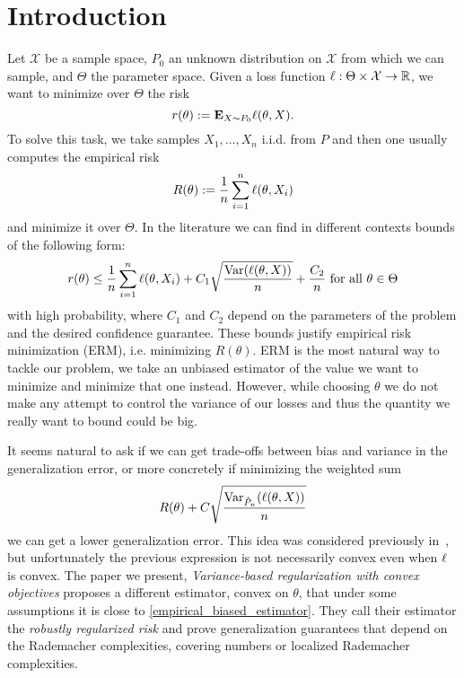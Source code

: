 %
%


\section{Introduction}
Let $\mathcal{X}$ be a sample space, $P_0$ an unknown distribution on $\mathcal{X}$ from which we can sample, and $\Theta$ the parameter space. Given a loss function $\ell : \Theta \times \mathcal{X} \rightarrow \mathbb{R}$, we want to minimize over $\Theta$ the risk
\[
    r(\theta) := \mathbf{E}_{X\sim P_0} \ell(\theta, X).
\]
To solve this task, we take samples $X_1, \dots, X_n$ i.i.d. from $P$ and then one usually computes the empirical risk
\[
    R(\theta) := \frac{1}{n} \sum_{i=1}^n \ell(\theta, X_i)
\]
and minimize it over $\Theta$. In the literature we can find in different contexts bounds of the following form:
\[
    r(\theta) \leq \frac{1}{n} \sum_{i=1}^n \ell(\theta, X_i) + C_1 \sqrt{\frac{\operatorname{Var}(\ell(\theta, X))}{n}} + \frac{C_2}{n} \text{ for all } \theta \in \Theta
\]
with high probability, where $C_1$ and $C_2$ depend on the parameters of the problem and the desired confidence guarantee. These bounds justify empirical risk minimization (ERM), i.e. minimizing $R(\theta)$. ERM is the most natural way to tackle our problem, we take an unbiased estimator of the value we want to minimize and minimize that one instead. However, while choosing $\theta$ we do not make any attempt to control the variance of our losses and thus the quantity we really want to bound could be big.

It seems natural to ask if we can get trade-offs between bias and variance in the generalization error, or more concretely if minimizing the weighted sum
\begin{equation}\label{empirical_biased_estimator}
R(\theta) + C\sqrt{\frac{\operatorname{Var}_{\hat{P}_n}(\ell(\theta, X))}{n}}
\end{equation}
we can get a lower generalization error. This idea was considered previously in~\cite{maurer2009empirical}, but unfortunately the previous expression is not necessarily convex even when $\ell$ is convex. The paper we present, \textit{Variance-based regularization with convex objectives} \cite{duchi17roubust} proposes a different estimator, convex on $\theta$, that under some assumptions it is close to \eqref{empirical_biased_estimator}. They call their estimator the \textit{robustly regularized risk} and prove generalization guarantees that depend on the Rademacher complexities, covering numbers or localized Rademacher complexities.

